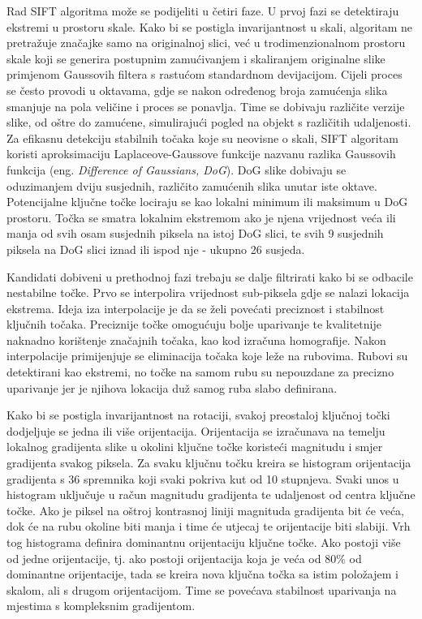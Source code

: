 Rad SIFT algoritma može se podijeliti u četiri faze. U prvoj fazi se detektiraju ekstremi u prostoru skale. Kako bi se postigla invarijantnost u skali, algoritam ne pretražuje značajke samo na originalnoj slici, već u trodimenzionalnom prostoru skale koji se generira postupnim zamućivanjem i skaliranjem originalne slike primjenom Gaussovih filtera s rastućom standardnom devijacijom. 
Cijeli proces se često provodi u oktavama, gdje se nakon određenog broja zamućenja slika smanjuje na pola veličine i proces se ponavlja. Time se dobivaju različite verzije slike, od oštre do zamućene, simulirajući pogled na objekt s različitih udaljenosti. Za efikasnu detekciju stabilnih točaka koje su neovisne o skali, SIFT algoritam koristi aproksimaciju Laplaceove-Gaussove funkcije nazvanu razlika Gaussovih funkcija (eng. \textit{Difference of Gaussians, DoG}). DoG slike dobivaju se oduzimanjem dviju susjednih, različito zamućenih slika unutar iste oktave. Potencijalne ključne točke lociraju se kao lokalni minimum ili maksimum u DoG prostoru. Točka se smatra lokalnim ekstremom ako je njena vrijednost veća ili manja od svih osam susjednih piksela na istoj DoG slici, te svih 9 susjednih piksela na DoG slici iznad ili ispod nje - ukupno 26 susjeda.

Kandidati dobiveni u prethodnoj fazi trebaju se dalje filtrirati kako bi se odbacile nestabilne točke. Prvo se interpolira vrijednost sub-piksela gdje se nalazi lokacija ekstrema. Ideja iza interpolacije je da se želi povećati preciznost i stabilnost ključnih točaka. Preciznije točke omogućuju bolje uparivanje te kvalitetnije naknadno korištenje značajnih točaka, kao kod izračuna homografije. Nakon interpolacije primijenjuje se eliminacija točaka koje leže na rubovima. Rubovi su detektirani kao ekstremi, no točke na samom rubu su nepouzdane za precizno uparivanje jer je njihova lokacija duž samog ruba slabo definirana.

Kako bi se postigla invarijantnost na rotaciji, svakoj preostaloj ključnoj točki dodjeljuje se jedna ili više orijentacija. Orijentacija se izračunava na temelju lokalnog gradijenta slike u okolini ključne točke koristeći magnitudu i smjer gradijenta svakog piksela. Za svaku ključnu točku kreira se histogram orijentacija gradijenta s 36 spremnika koji svaki pokriva kut od 10 stupnjeva. 
Svaki unos u histogram uključuje u račun magnitudu gradijenta te udaljenost od centra ključne točke. Ako je piksel na oštroj kontrasnoj liniji magnituda gradijenta bit će veća, dok će na rubu okoline biti manja i time će utjecaj te orijentacije biti slabiji. Vrh tog histograma definira dominantnu orijentaciju ključne točke. Ako postoji više od jedne orijentacije, tj. ako postoji orijentacija koja je veća od 80\% od dominantne orijentacije, tada se kreira nova ključna točka sa istim položajem i skalom, ali s drugom orijentacijom. Time se povećava stabilnost uparivanja na mjestima s kompleksnim gradijentom.

